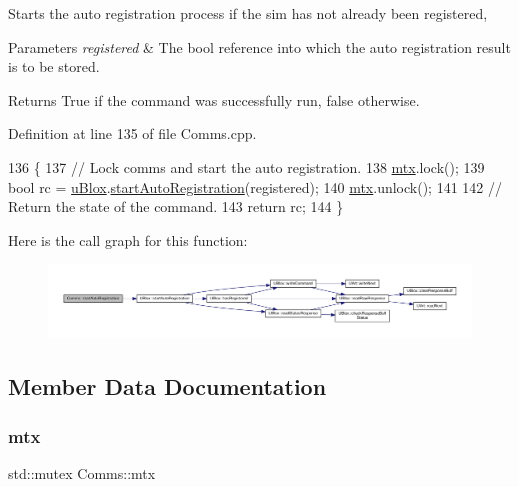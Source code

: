 Starts the auto registration process if the sim has not already been registered,


\begin{DoxyParams}{Parameters}
{\em registered} & The bool reference into which the auto registration result is to be stored. \\
\hline
\end{DoxyParams}
\begin{DoxyReturn}{Returns}
True if the command was successfully run, false otherwise. 
\end{DoxyReturn}


Definition at line 135 of file Comms.\+cpp.


\begin{DoxyCode}
136 \{
137     \textcolor{comment}{// Lock comms and start the auto registration.}
138     \hyperlink{class_comms_a21df861b1202573e4cd0cb5666d638fe}{mtx}.lock();
139     \textcolor{keywordtype}{bool} rc = \hyperlink{class_comms_ac64dea134b116147e5441172346dbd6c}{uBlox}.\hyperlink{class_u_blox_a2e816e864ebf43743b3f6187e20c2b1f}{startAutoRegistration}(registered);
140     \hyperlink{class_comms_a21df861b1202573e4cd0cb5666d638fe}{mtx}.unlock();
141 
142     \textcolor{comment}{// Return the state of the command.}
143     \textcolor{keywordflow}{return} rc;
144 \}
\end{DoxyCode}
Here is the call graph for this function\+:\nopagebreak
\begin{figure}[H]
\begin{center}
\leavevmode
\includegraphics[width=350pt]{d8/dcc/class_comms_a9563254514d2f64c0427be2aeaba26d8_cgraph}
\end{center}
\end{figure}


\subsection{Member Data Documentation}
\mbox{\label{class_comms_a21df861b1202573e4cd0cb5666d638fe}} 
\subsubsection{\texorpdfstring{mtx}{mtx}}
{\footnotesize\ttfamily std\+::mutex Comms\+::mtx\hspace{0.3cm}{\ttfamily [private]}}



